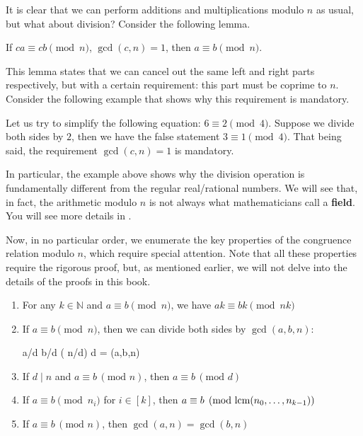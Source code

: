 \documentclass[../../book.tex]{subfiles}
\begin{document}
It is clear that we can perform additions and multiplications modulo $n$ as usual, but what 
about division? Consider the following lemma.

\begin{lemma}
    If $ca \equiv cb \pmod{n}$, $\gcd(c, n) = 1$, then $ a \equiv b \pmod{n}$.
\end{lemma}

This lemma states that we can cancel out the same left and right parts
respectively, but with a certain requirement: this part must be coprime to $n$.
Consider the following example that shows why this requirement is mandatory.

\begin{example}
    Let us try to simplify the following equation: $6 \equiv 2 \pmod{4}$. Suppose we 
    divide both sides by $2$, then we have the false statement $3 \equiv 1 \pmod{4}$. 
    That being said, the requirement $\gcd(c, n) = 1$ is mandatory. 
\end{example}

\begin{remark}
    In particular, the example above shows why the division operation is fundamentally 
    different from the regular real/rational numbers. We will see that, in fact, the 
    arithmetic modulo $n$ is not always what mathematicians call a \textbf{field}. 
    You will see more details in .
\end{remark}

Now, in no particular order, we enumerate the key properties of the congruence relation modulo $n$, 
which require special attention. Note that all these properties require the rigorous proof,
but, as mentioned earlier, we will not delve into the details of the proofs in this book.

\begin{lemma}\label{lemma:congruence_scale}
    \hfill
    \begin{enumerate}
        \item For any $k \in \mathbb{N}$ and $a \equiv b \pmod{n}$, we have $ak \equiv bk \pmod{nk}$
        \item If $a \equiv b \pmod{n}$, then we can divide both sides by $\gcd(a, b, n)$:
        \begin{xequation*}
            a/d \equiv b/d \; (\; n/d) \;  \; d = \gcd(a,b,n)
        \end{xequation*}
        \item If $d \mid n$ and $a \equiv b \, (\text{mod } n)$, then $a \equiv b \, (\text{mod } d)$
        \item If $a \equiv b \pmod{n_i}$ for $i \in [k]$, then $a \equiv b \pmod{\text{lcm}(n_0,\dots,n_{k-1})}$
        \item If $a \equiv b \, (\text{mod } n)$, then $\gcd(a, n) = \gcd(b, n)$
\end{enumerate}
\end{lemma}
\end{document}
